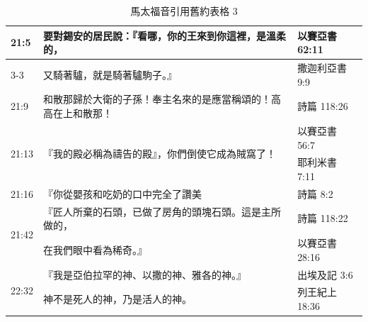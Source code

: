 \begin{table}[htbp]
\begin{tabular}{|p{4.93em}|p{}|p{}|}
    \midrule
    \multicolumn{1}{|l|}{\multirow{2}[4]{*}{21:5}} & 要對錫安的居民說：『看哪，你的王來到你這裡，是溫柔的， &以賽亞書 62:11 \\
\cmidrule{3-3}          & 又騎著驢，就是騎著驢駒子。』 & 撒迦利亞書 9:9 \\
    \midrule
    \multicolumn{1}{|p{4.93em}|}{21:9} & 和散那歸於大衛的子孫！奉主名來的是應當稱頌的！高高在上和散那！ & 詩篇 118:26 \\
    \midrule
    \multicolumn{1}{|l|}{\multirow{2}[4]{*}{21:13}} & \multirow{2}[4]{*}{『我的殿必稱為禱告的殿』，你們倒使它成為賊窩了！} & 以賽亞書 56:7 \\
\cmidrule{3-3}          & \multicolumn{1}{l|}{} & 耶利米書 7:11 \\
    \midrule
    \multicolumn{1}{|p{4.93em}|}{21:16} & 『你從嬰孩和吃奶的口中完全了讚美 & 詩篇 8:2 \\
    \midrule
    \multicolumn{1}{|l|}{\multirow{2}[4]{*}{21:42}} & 『匠人所棄的石頭，已做了房角的頭塊石頭。這是主所做的， & 詩篇 118:22 \\
\cmidrule{3-3}          & 在我們眼中看為稀奇。』 & 以賽亞書 28:16 \\
    \midrule
    \multicolumn{1}{|l|}{\multirow{2}[4]{*}{22:32}} & 『我是亞伯拉罕的神、以撒的神、雅各的神。』 & 出埃及記 3:6 \\
\cmidrule{3-3}          & 神不是死人的神，乃是活人的神。 & 列王紀上 18:36 \\
    \bottomrule
    \end{tabular}%
  \label{tab:addlabel}%
  \caption{馬太福音引用舊約表格 3} 
\end{table}%


